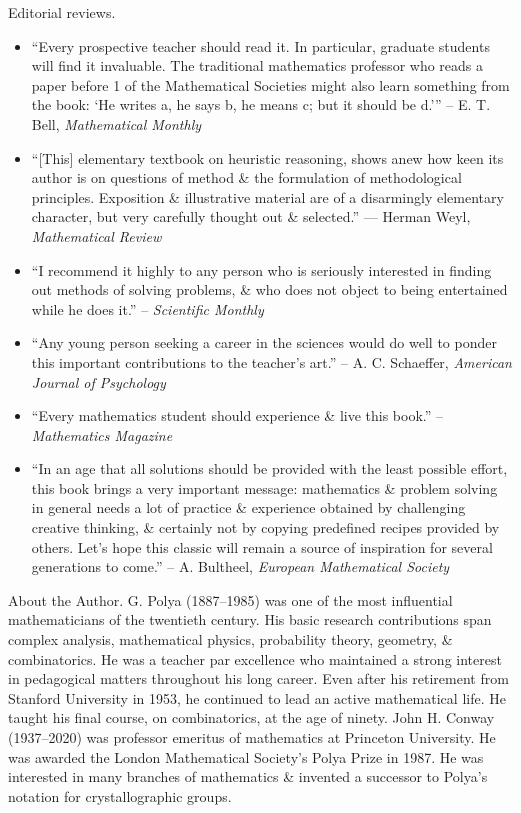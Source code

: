 \documentclass{article}
\begin{document}
\begin{enumerate}
	{\sf Editorial reviews.}
	\begin{itemize}
		\item ``Every prospective teacher should read it. In particular, graduate students will find it invaluable. The traditional mathematics professor who reads a paper before 1 of the Mathematical Societies might also learn something from the book: `He writes a, he says b, he means c; but it should be d.''' -- {\sc E. T. Bell}, {\it Mathematical Monthly}
		\item ``[This] elementary textbook on heuristic reasoning, shows anew how keen its author is on questions of method \& the formulation of methodological principles. Exposition \& illustrative material are of a disarmingly elementary character, but very carefully thought out \& selected.'' --- {\sc Herman Weyl}, {\it Mathematical Review}
		\item ``I recommend it highly to any person who is seriously interested in finding out methods of solving problems, \& who does not object to being entertained while he does it.'' -- {\it Scientific Monthly}
		\item ``Any young person seeking a career in the sciences would do well to ponder this important contributions to the teacher's art.'' -- {\sc A. C. Schaeffer}, {\it American Journal of Psychology}
		\item ``Every mathematics student should experience \& live this book.'' -- {\it Mathematics Magazine}
		\item ``In an age that all solutions should be provided with the least possible effort, this book brings a very important message: mathematics \& problem solving in general needs a lot of practice \& experience obtained by challenging creative thinking, \& certainly not by copying predefined recipes provided by others. Let's hope this classic will remain a source of inspiration for several generations to come.'' -- {\sc A. Bultheel}, {\it European Mathematical Society}
	\end{itemize}
	{\sf About the Author.} {\sc G. Polya} (1887--1985) was one of the most influential mathematicians of the twentieth century. His basic research contributions span complex analysis, mathematical physics, probability theory, geometry, \& combinatorics. He was a teacher par excellence who maintained a strong interest in pedagogical matters throughout his long career. Even after his retirement from Stanford University in 1953, he continued to lead an active mathematical life. He taught his final course, on combinatorics, at the age of ninety. John H. Conway (1937--2020) was professor emeritus of mathematics at Princeton University. He was awarded the London Mathematical Society's Polya Prize in 1987. He was interested in many branches of mathematics \& invented a successor to {\sc Polya}'s notation for crystallographic groups.


\end{enumerate}
\end{document}
